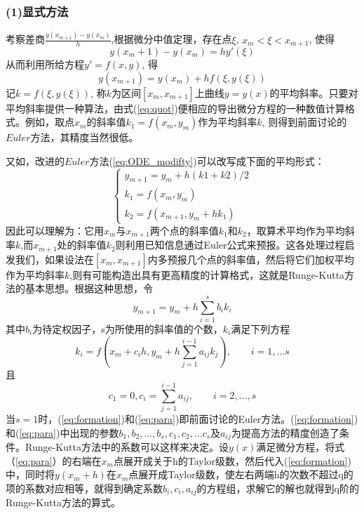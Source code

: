 \subsubsection{(1)显式方法}

考察差商$\frac{y(x_{m+1})-y(x_m)}{h}$,根据微分中值定理，存在点$\xi$, $x_m < \xi <x_{m+1}$, 使得
$$y(x_m+1)- y(x_m)=h y'(\xi)$$
从而利用所给方程$y' = f(x,y)$, 得
\begin{equation}\label{eq:quot}
        y(x_{m+1}) = y(x_m) + h f(\xi,y(\xi))
\end{equation}
记$ k = f(\xi,y(\xi))$, 称$k$为区间$[x_m,x_{m+1}]$上曲线$y = y(x)$的平均斜率。只要对平均斜率提供一种算法，由式(\ref{eq:quot})便相应的导出微分方程的一种数值计算格式。例如，取点$x_m$的斜率值$k_1= f(x_m ,y_m )$作为平均斜率$k$, 则得到前面讨论的$Euler$方法，其精度当然很低。

又如，改进的$Euler$方法(\ref{eq:ODE_modifty})可以改写成下面的平均形式：
\begin{equation}
		\begin{cases}
				y_{m+1} = y_m +h(k1+k2)/2\\
				k_1 = f(x_m,y_m)\\
				k_2 = f(x_{m+1} , y_m+hk_1)
		\end{cases}
\end{equation}
因此可以理解为：它用$x_m$与$x_{m+1}$两个点的斜率值$k_1$和$k_2$，取算术平均作为平均斜率$k$,而$x_{m+1}$处的斜率值$k_2$则利用已知信息通过Euler公式来预报。这各处理过程启发我们，如果设法在$[x_m,x_{m+1}]$内多预报几个点的斜率值，然后将它们加权平均作为平均斜率$k$,则有可能构造出具有更高精度的计算格式，这就是Runge-Kutta方法的基本思想。根据这种思想，令
\begin{equation}\label{eq:formation}
		y_{m+1}= y_m + h \sum_{i=1}^s b_i k_i
\end{equation}
其中$b_i$为待定权因子，s为所使用的斜率值的个数，$k_i$满足下列方程
\begin{equation}\label{eq:para}
		k_i = f(x_m+c_i h , y_m +h \sum_{j=1}^{i-1} a_{ij}k_j) , \quad\quad i = 1, ... s
\end{equation}
且
$$ c_1 = 0 , c_i = \sum_{j=1}^{i-1}a_{ij}, \quad\quad i = 2 , ... ,s$$
当$s =1$时，(\ref{eq:formation})和(\ref{eq:para})即前面讨论的Euler方法。(\ref{eq:formation})和(\ref{eq:para})中出现的参数$b_1,b_2,...,b_s,c_1,c_2,...c_s$及$a_{ij}$为提高方法的精度创造了条件。Runge-Kutta方法中的系数可以这样来决定。设$y(x)$满足微分方程，将式（\ref{eq:para}）的右端在$x_m$点展开成关于h的Taylor级数，然后代入(\ref{eq:formation})中，同时将$y(x_m+h)$在$x_m$点展开成Taylor级数，使左右两端h的次数不超过q的项的系数对应相等，就得到确定系数$b_i, c_i, a_{ij}$的方程组，求解它的解也就得到q阶的Runge-Kutta方法的算式。

